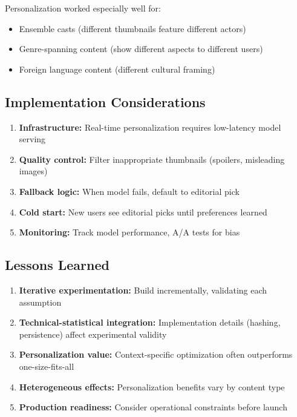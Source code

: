 Personalization worked especially well for:
\begin{itemize}
    \item Ensemble casts (different thumbnails feature different actors)
    \item Genre-spanning content (show different aspects to different users)
    \item Foreign language content (different cultural framing)
\end{itemize}

\subsection{Implementation Considerations}

\begin{enumerate}
    \item \textbf{Infrastructure:} Real-time personalization requires low-latency model serving

    \item \textbf{Quality control:} Filter inappropriate thumbnails (spoilers, misleading images)

    \item \textbf{Fallback logic:} When model fails, default to editorial pick

    \item \textbf{Cold start:} New users see editorial picks until preferences learned

    \item \textbf{Monitoring:} Track model performance, A/A tests for bias
\end{enumerate}

\subsection{Lessons Learned}

\begin{enumerate}
    \item \textbf{Iterative experimentation:} Build incrementally, validating each assumption

    \item \textbf{Technical-statistical integration:} Implementation details (hashing, persistence) affect experimental validity

    \item \textbf{Personalization value:} Context-specific optimization often outperforms one-size-fits-all

    \item \textbf{Heterogeneous effects:} Personalization benefits vary by content type

    \item \textbf{Production readiness:} Consider operational constraints before launch
\end{enumerate}

